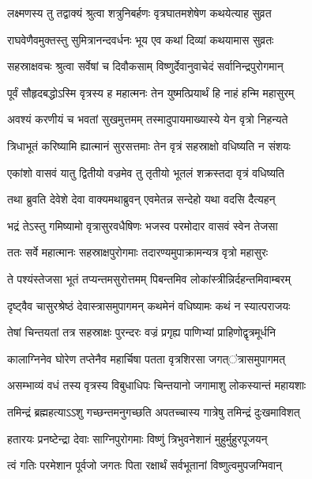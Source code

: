 
\twolineshloka
{लक्ष्मणस्य तु तद्वाक्यं श्रुत्वा शत्रुनिबर्हणः}
{वृत्रघातमशेषेण कथयेत्याह सुव्रत} %

\twolineshloka
{राघवेणैवमुक्तस्तु सुमित्रानन्दवर्धनः}
{भूय एव कथां दिव्यां कथयामास सुव्रतः} %

\twolineshloka
{सहस्राक्षवचः श्रुत्वा सर्वेषां च दिवौकसाम्}
{विष्णुर्देवानुवाचेदं सर्वानिन्द्रपुरोगमान्} %

\twolineshloka
{पूर्वं सौहृदबद्धोऽस्मि वृत्रस्य ह महात्मनः}
{तेन युष्मत्प्रियार्थं हि नाहं हन्मि महासुरम्} %

\twolineshloka
{अवश्यं करणीयं च भवतां सुखमुत्तमम्}
{तस्मादुपायमाख्यास्ये येन वृत्रो निहन्यते} %

\twolineshloka
{त्रिधाभूतं करिष्यामि ह्यात्मानं सुरसत्तमाः}
{तेन वृत्रं सहस्राक्षो वधिष्यति न संशयः} %

\twolineshloka
{एकांशो वासवं यातु द्वितीयो वज्रमेव तु}
{तृतीयो भूतलं शक्रस्तदा वृत्रं वधिष्यति} %

\twolineshloka
{तथा ब्रुवति देवेशे देवा वाक्यमथाब्रुवन्}
{एवमेतन्न सन्देहो यथा वदसि दैत्यहन्} %

\twolineshloka
{भद्रं तेऽस्तु गमिष्यामो वृत्रासुरवधैषिणः}
{भजस्व परमोदार वासवं स्वेन तेजसा} %

\twolineshloka
{ततः सर्वे महात्मानः सहस्राक्षपुरोगमाः}
{तदारण्यमुपाक्रामन्यत्र वृत्रो महासुरः} %

\twolineshloka
{ते पश्यंस्तेजसा भूतं तप्यन्तमसुरोत्तमम्}
{पिबन्तमिव लोकांस्त्रीन्निर्दहन्तमिवाम्बरम्} %

\twolineshloka
{दृष्ट्वैव चासुरश्रेष्ठं देवास्त्रासमुपागमन्}
{कथमेनं वधिष्यामः कथं न स्यात्पराजयः} %

\twolineshloka
{तेषां चिन्तयतां तत्र सहस्राक्षः पुरन्दरः}
{वज्रं प्रगृह्य पाणिभ्यां प्राहिणोद्वृत्रमूर्धनि} %

\twolineshloka
{कालाग्निनेव घोरेण तप्तेनैव महार्चिषा}
{पतता वृत्रशिरसा जगत्ऺत्रासमुपागमत्} %

\twolineshloka
{असम्भाव्यं वधं तस्य वृत्रस्य विबुधाधिपः}
{चिन्तयानो जगामाशु लोकस्यान्तं महायशाः} %

\twolineshloka
{तमिन्द्रं ब्रह्महत्याऽऽशु गच्छन्तमनुगच्छति}
{अपतच्चास्य गात्रेषु तमिन्द्रं दुःखमाविशत्} %

\twolineshloka
{हतारयः प्रनष्टेन्द्रा देवाः साग्निपुरोगमाः}
{विष्णुं त्रिभुवनेशानं मुहुर्मुहुरपूजयन्} %

\twolineshloka
{त्वं गतिः परमेशान पूर्वजो जगतः पिता}
{रक्षार्थं सर्वभूतानां विष्णुत्वमुपजग्मिवान्} %


